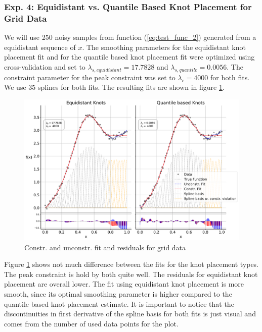 \documentclass[10pt,a4paper]{article}
\begin{document}
\subsubsection{Exp. 4: Equidistant vs. Quantile Based Knot Placement for Grid Data}

We will use 250 noisy samples from function (\ref{eq:test_func_2}) generated from a equidistant sequence of $x$. The smoothing parameters for the equidistant knot placement fit and for the quantile based knot placement fit were optimized using cross-validation and set to $\lambda_{s,equidistant} = 17.7828$ and $\lambda_{s, quantile} = 0.0056$. The constraint parameter for the peak constraint was set to $\lambda_c = 4000$ for both fits. We use 35 splines for both fits. The resulting fits are shown in figure \ref{fig:fit_grid_250}.

\begin{figure}[H]
	\centering
	\includegraphics[width=\columnwidth]{../thesisplots/exp_grid/exp_grid_ndata_250_rseed_1.pdf}
	\caption{Constr. and unconstr. fit and residuals for grid data}
	\label{fig:fit_grid_250}
\end{figure}

Figure \ref{fig:fit_grid_250} shows not much difference between the fits for the knot placement types. The peak constraint is hold by both quite well. The residuals for  equidistant knot placement are overall lower. The fit using equidistant knot placement is more smooth, since its optimal smoothing parameter is higher compared to the quantile based knot placement estimate. It is important to notice that the discontinuities in first derivative of the spline basis for both fits is just visual and comes from the number of used data points for the plot. 
\end{document}
